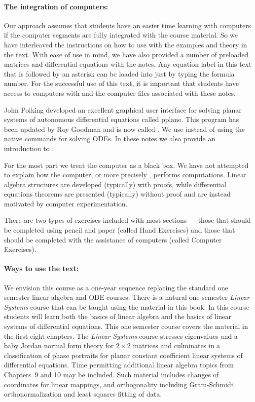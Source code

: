\documentclass{ximera}
\begin{document}
\paragraph{The integration of computers:}  Our approach assumes that students 
have an easier time learning with 
computers if the computer segments are fully integrated with the course 
material.  So we have interleaved the instructions on how to use \Matlab 
with the examples and theory in the text.  With ease of use in mind, we 
have also provided a number of preloaded matrices and differential equations 
with the notes.  Any equation label in this text that is followed by an 
asterisk can be loaded into \Matlab just by typing the formula number.  For 
the successful use of this text, it is important that students have access 
to computers with \Matlab and the computer files associated with these notes.

John Polking developed an excellent graphical user interface for solving
planar systems of autonomous differential equations called {\textsf{pplane}}.  
This program has been updated by Roy Goodman
 and is now called {\pplane}.
We use {\pplane} instead of using the \Matlab native commands for solving ODEs. 
In these notes we also provide an introduction to {\pplane}. 

For the most part we treat the computer as a black box.  We have not
attempted to explain how the computer, or more precisely \Matlabp, 
performs computations.   Linear algebra structures are developed (typically) 
with proofs, while differential equations theorems are presented (typically) 
without proof and are instead motivated by computer experimentation.  

There are two types of exercises included with most sections --- those that 
should be completed using pencil and paper (called Hand Exercises) and 
those that should be completed with the assistance of computers (called 
Computer Exercises).  

\paragraph{Ways to use the text:}  We envision this course as a one-year 
sequence replacing the standard one semester linear algebra and ODE courses. 
There is a natural one semester {\em Linear Systems\/} course that can be 
taught using the material in this book. In this course students will
learn both the basics of linear algebra and the basics of linear systems of
differential equations.  This one semester course covers the material in the 
first eight chapters.  The {\em Linear Systems\/} course stresses eigenvalues 
and a baby Jordan normal form theory for $2\times 2$ matrices and culminates 
in a classification of phase portraits for planar constant coefficient linear 
systems of differential equations.   Time permitting additional linear 
algebra topics from Chapters~9 and 10 may be included.  Such material 
includes changes of coordinates for linear mappings, and orthogonality 
including Gram-Schmidt orthonormalization and least squares fitting of data.
\end{document}

